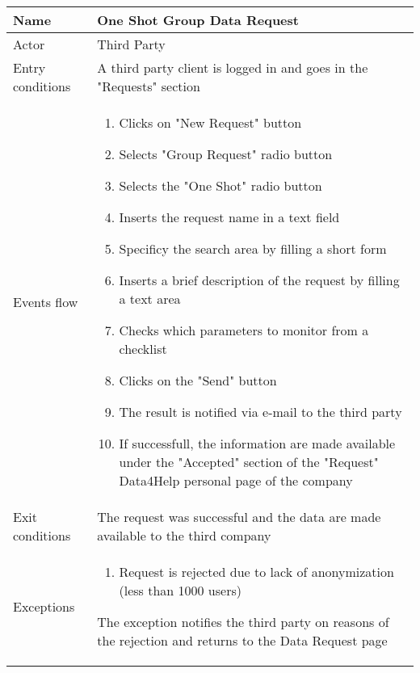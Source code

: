 \newpage
\begin{table}[h!]
\begin{tabular}{|l|p{12cm}|}
\hline
Name             & One Shot Group Data Request \\ \hline
Actor            & Third Party \\ \hline
Entry conditions & A third party client is logged in and goes in the "Requests" 
section\\ \hline
Events flow      & \begin{enumerate}
\item Clicks on "New Request" button
\item Selects "Group Request" radio button
\item Selects the "One Shot" radio button
\item Inserts the request name in a text field
\item Specificy the search area by filling a short form
\item Inserts a brief description of the request by filling a text area
\item Checks which parameters to monitor from a checklist
\item Clicks on the "Send" button
\item The result is notified via e-mail to the third party
\item If successfull, the information are made available under the "Accepted" 
section of the "Request" Data4Help personal page of the company
\end{enumerate} \\ \hline
Exit conditions  & The request was successful and the data are made available 
to the third company \\ \hline
Exceptions       & \begin{enumerate}
\item Request is rejected due to lack of anonymization (less than 1000 users)
\end{enumerate} The exception notifies the third party on reasons of the rejection 
and returns to the Data Request page\\ \hline
\end{tabular}
\end{table}

